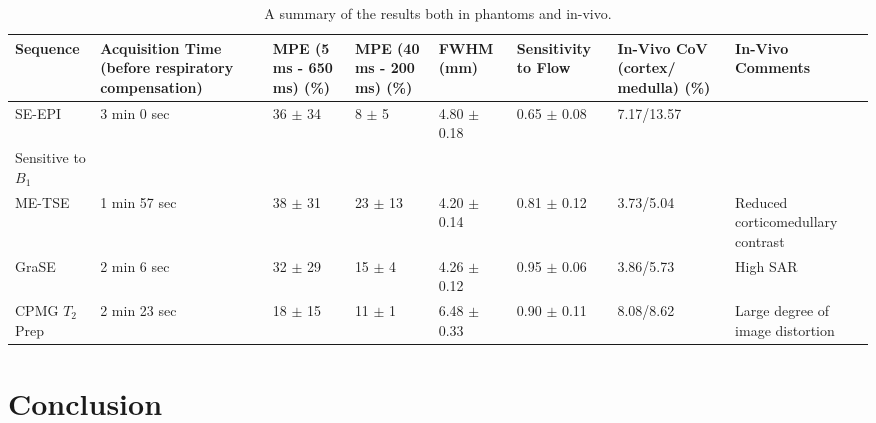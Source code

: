 \begin{table}[H]
	\centering
	\begin{adjustbox}{width=1.0\textwidth, center}
		\begin{tabularx}{1.6\textwidth}{X|X|X|X|X|X|X|X}
			Sequence        & Acquisition Time  \scriptsize{(before respiratory compensation)} & MPE  (5 ms - 650 ms) (\%) & MPE  (40 ms - 200 ms) (\%) & FWHM (mm)       & Sensitivity to Flow & In-Vivo CoV (cortex/ medulla) (\%) & In-Vivo Comments                                                        \\ \hline
			SE-EPI          & 3 min 0 sec                                                      & 36 $\pm$ 34               & 8 $\pm$ 5                  & 4.80 $\pm$ 0.18 & 0.65 $\pm$  0.08    & 7.17/13.57                        & \begin{tabular}[c]{@{}l@{}}Inaccurate\\ Sensitive to $B_1$\end{tabular} \\ \hline
			ME-TSE          & 1 min 57 sec                                                     & 38 $\pm$ 31               & 23 $\pm$ 13                & 4.20 $\pm$ 0.14 & 0.81 $\pm$ 0.12     & 3.73/5.04                         & Reduced corticomedullary contrast                                       \\ \hline
			GraSE           & 2 min 6 sec                                                      & 32 $\pm$ 29               & 15 $\pm$ 4                 & 4.26 $\pm$ 0.12 & 0.95 $\pm$ 0.06     & 3.86/5.73                         & High SAR                                                                \\ \hline
			CPMG $T_2$ Prep & 2 min 23 sec                                                     & 18 $\pm$ 15               & 11 $\pm$ 1                 & 6.48 $\pm$ 0.33 & 0.90 $\pm$ 0.11     & 8.08/8.62                         & Large degree of image distortion                                  
		\end{tabularx}
	\end{adjustbox}
	\caption{A summary of the results both in phantoms and in-vivo.}
	\label{tab:t2_results_summary}
\end{table}



\newpage

\section{Conclusion}

